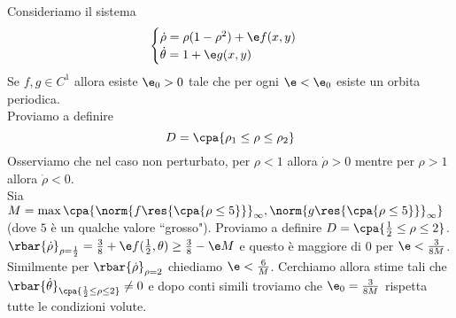 \begin{example}
Consideriamo il sistema
\[\begin{cases}
\dot \rho=\rho(1-\rho^2) + \e f(x,y)\\
\dot \theta=1+\e g(x,y)
\end{cases}\]
Se $f,g\in C^1$ allora esiste $\e_0>0$ tale che per ogni $\e<\e_0$ esiste un orbita periodica.\\
Proviamo a definire
\[D=\cpa{\rho_1\leq\rho\leq\rho_2}\]
Osserviamo che nel caso non perturbato, per $\rho<1$ allora $\dot \rho>0$ mentre per $\rho>1$ allora $\dot \rho<0$.\\
Sia $M=\max\cpa{\norm {f\res{\cpa{\rho\leq 5}}}_\infty, \norm {g\res{\cpa{\rho\leq 5}}}_\infty}$ (dove $5$ \`e un qualche valore ``grosso"). Proviamo a definire $D=\cpa{\frac12\leq \rho\leq 2}$.\\
$\rbar{\dot \rho}_{\rho=\frac12}=\frac38+\e f(\frac12,\theta)\geq \frac38-\e M$ e questo \`e maggiore di $0$ per $\e<\frac3{8M}$.
Similmente per $\rbar{\dot \rho}_{\rho=2}$ chiediamo $\e<\frac6M$. Cerchiamo allora stime tali che
$\rbar{\dot \theta}_{\cpa{\frac12\leq \rho\leq 2}}\neq 0$ e dopo conti simili troviamo che $\e_0=\frac3{8M}$ rispetta tutte le condizioni volute.
\end{example}